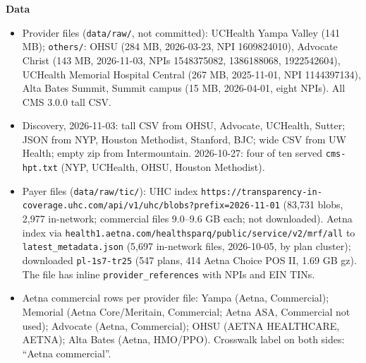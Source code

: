 \textbf{Data}
\begin{itemize}
\item Provider files (\texttt{data/raw/}, not committed): UCHealth Yampa Valley (141 MB); \texttt{others/}: OHSU (284 MB, 2026-03-23, NPI 1609824010), Advocate Christ (143 MB, 2026-11-03, NPIs 1548375082, 1386188068, 1922542604), UCHealth Memorial Hospital Central (267 MB, 2025-11-01, NPI 1144397134), Alta Bates Summit, Summit campus (15 MB, 2026-04-01, eight NPIs). All CMS 3.0.0 tall CSV.
\item Discovery, 2026-11-03: tall CSV from OHSU, Advocate, UCHealth, Sutter; JSON from NYP, Houston Methodist, Stanford, BJC; wide CSV from UW Health; empty zip from Intermountain. 2026-10-27: four of ten served \texttt{cms-hpt.txt} (NYP, UCHealth, OHSU, Houston Methodist).
\item Payer files (\texttt{data/raw/tic/}): UHC index \texttt{https://transparency-in-coverage.uhc.com/api/v1/uhc/blobs?prefix=2026-11-01} (83,731 blobs, 2,977 in-network; commercial files 9.0--9.6 GB each; not downloaded). Aetna index via \texttt{health1.aetna.com/healthsparq/public/service/v2/mrf/all} to \texttt{latest\_metadata.json} (5,697 in-network files, 2026-10-05, by plan cluster); downloaded \texttt{pl-1s7-tr25} (547 plans, 414 Aetna Choice POS II, 1.69 GB gz). The file has inline \texttt{provider\_references} with NPIs and EIN TINs.
\item Aetna commercial rows per provider file: Yampa (Aetna, Commercial); Memorial (Aetna Core/Meritain, Commercial; Aetna ASA, Commercial not used); Advocate (Aetna, Commercial); OHSU (AETNA HEALTHCARE, AETNA); Alta Bates (Aetna, HMO/PPO). Crosswalk label on both sides: ``Aetna commercial''.
\end{itemize}

